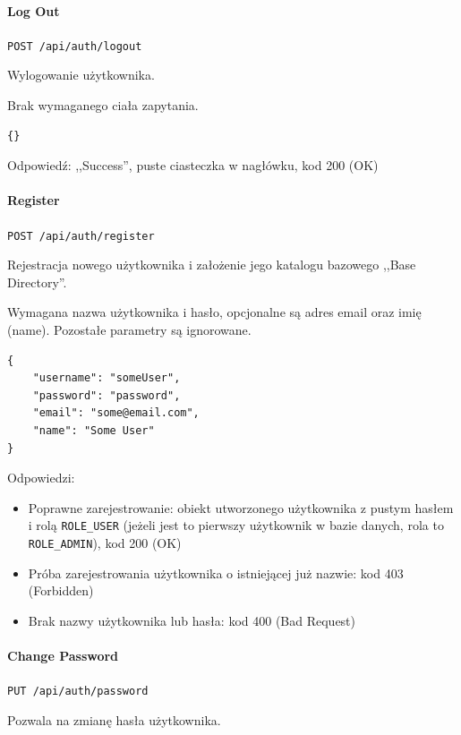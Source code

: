 \documentclass[a4paper,twoside,12pt]{book}
\begin{document}
\paragraph{Log Out} 

\texttt{POST /api/auth/logout}



Wylogowanie użytkownika.

Brak wymaganego ciała zapytania.

\begin{verbatim}
{}
\end{verbatim}

Odpowiedź: ,,Success'', puste ciasteczka w nagłówku, kod 200 (OK)

\paragraph{Register}

\texttt{POST /api/auth/register}

Rejestracja nowego użytkownika i założenie jego katalogu bazowego ,,Base Directory''.

Wymagana nazwa użytkownika i hasło, opcjonalne są adres email oraz imię (name). Pozostałe parametry są ignorowane.

\begin{verbatim}
{
    "username": "someUser",
    "password": "password",
    "email": "some@email.com",
    "name": "Some User"
}
\end{verbatim}

Odpowiedzi: 
\begin{itemize}
	\item Poprawne zarejestrowanie: obiekt utworzonego użytkownika z pustym hasłem i rolą \texttt{ROLE_USER} (jeżeli jest to pierwszy użytkownik w bazie danych, rola to \texttt{ROLE_ADMIN}), kod 200 (OK) 
	\item Próba zarejestrowania użytkownika o istniejącej już nazwie: kod 403 (Forbidden) 
	\item Brak nazwy użytkownika lub hasła: kod 400 (Bad Request)
\end{itemize}

\paragraph{Change Password}

\texttt{PUT /api/auth/password}

Pozwala na zmianę hasła użytkownika.
\end{document}
